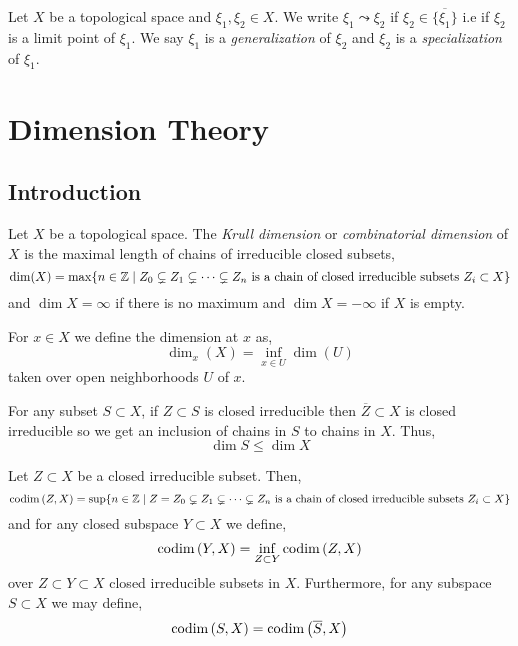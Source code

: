 \documentclass[12pt]{article}
\begin{document}
\begin{defn}
Let $X$ be a topological space and $\xi_1, \xi_2 \in X$. We write $\xi_1 \leadsto \xi_2$ if $\xi_2 \in \overline{\{ \xi_1 \}}$ i.e if $\xi_2$ is a limit point of $\xi_1$. We say $\xi_1$ is a \textit{generalization} of $\xi_2$ and $\xi_2$ is a \textit{specialization} of $\xi_1$.
\end{defn}

\section{Dimension Theory}

\subsection{Introduction}

\begin{defn}
Let $X$ be a topological space. The \textit{Krull dimension} or \textit{combinatorial dimension} of $X$ is the maximal length of chains of irreducible closed subsets,
\[ \dim(X) = \max \{ n \in \mathbb{Z} \mid Z_0 \subsetneq Z_1 \subsetneq \cdots \subsetneq Z_n \text{ is a chain of closed irreducible subsets } Z_i \subset X \} \]
and $\dim{X} = \infty$ if there is no maximum and $\dim{X} = -\infty$ if $X$ is empty.
\end{defn}

\begin{defn}
For $x \in X$ we define the dimension at $x$ as,
\[ \dim_{x}(X) = \inf_{x \in U} \dim{(U)} \]
taken over open neighborhoods $U$ of $x$.
\end{defn}

\begin{rmk}
For any subset $S \subset X$, if $Z \subset S$ is closed irreducible then $\overline{Z} \subset X$ is closed irreducible so we get an inclusion of chains in $S$ to chains in $X$. Thus,
\[ \dim{S} \le \dim{X} \]
\end{rmk}

\begin{defn}
Let $Z \subset X$ be a closed irreducible subset. Then,
\[ \mathrm{codim}\left( Z,X \right) = \sup \{ n \in \mathbb{Z} \mid Z = Z_0 \subsetneq Z_1 \subsetneq \cdots \subsetneq Z_n  \text{ is a chain of closed irreducible subsets } Z_i \subset X \} \]
and for any closed subspace $Y \subset X$ we define,
\[ \mathrm{codim}\left( Y, X \right) = \inf_{Z \subset Y} \mathrm{codim}\left( Z, X \right) \]
over $Z \subset Y \subset X$ closed irreducible subsets in $X$. Furthermore, for any subspace $S \subset X$ we may define,
\[ \mathrm{codim}\left( S, X \right) = \mathrm{codim}\left( \overline{S}, X \right) \]
\end{defn}
\end{document}
